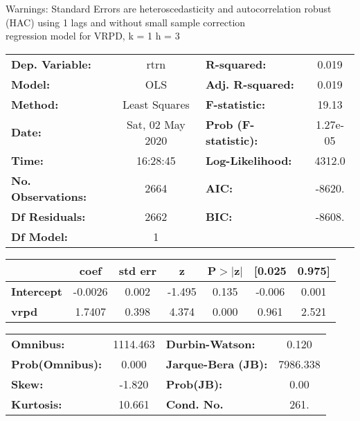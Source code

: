 Warnings: \newline
 [1] Standard Errors are heteroscedasticity and autocorrelation robust (HAC) using 1 lags and without small sample correction\\ 

regression model for VRPD, k = 1 h = 3\begin{center}
\begin{tabular}{lclc}
\toprule
\textbf{Dep. Variable:}    &       rtrn       & \textbf{  R-squared:         } &     0.019   \\
\textbf{Model:}            &       OLS        & \textbf{  Adj. R-squared:    } &     0.019   \\
\textbf{Method:}           &  Least Squares   & \textbf{  F-statistic:       } &     19.13   \\
\textbf{Date:}             & Sat, 02 May 2020 & \textbf{  Prob (F-statistic):} &  1.27e-05   \\
\textbf{Time:}             &     16:28:45     & \textbf{  Log-Likelihood:    } &    4312.0   \\
\textbf{No. Observations:} &        2664      & \textbf{  AIC:               } &    -8620.   \\
\textbf{Df Residuals:}     &        2662      & \textbf{  BIC:               } &    -8608.   \\
\textbf{Df Model:}         &           1      & \textbf{                     } &             \\
\bottomrule
\end{tabular}
\begin{tabular}{lcccccc}
                   & \textbf{coef} & \textbf{std err} & \textbf{z} & \textbf{P$> |$z$|$} & \textbf{[0.025} & \textbf{0.975]}  \\
\midrule
\textbf{Intercept} &      -0.0026  &        0.002     &    -1.495  &         0.135        &       -0.006    &        0.001     \\
\textbf{vrpd}      &       1.7407  &        0.398     &     4.374  &         0.000        &        0.961    &        2.521     \\
\bottomrule
\end{tabular}
\begin{tabular}{lclc}
\textbf{Omnibus:}       & 1114.463 & \textbf{  Durbin-Watson:     } &    0.120  \\
\textbf{Prob(Omnibus):} &   0.000  & \textbf{  Jarque-Bera (JB):  } & 7986.338  \\
\textbf{Skew:}          &  -1.820  & \textbf{  Prob(JB):          } &     0.00  \\
\textbf{Kurtosis:}      &  10.661  & \textbf{  Cond. No.          } &     261.  \\
\bottomrule
\end{tabular}
\end{center}

